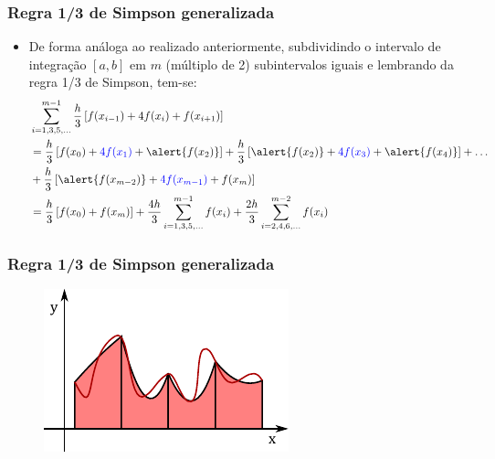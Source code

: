 \documentclass{beamer}
\theoremstyle{mystyle}
\begin{document}
\begin{frame}
	\frametitle{Regra 1/3 de Simpson generalizada}
	\begin{itemize}
		\item De forma análoga ao realizado anteriormente, subdividindo o intervalo de integração $ [a, b] $ em $ m $ (múltiplo de 2) subintervalos iguais e lembrando da regra 1/3 de Simpson, tem-se:
		\begin{align*}
			&\sum_{i=1,3,5,\ldots}^{m-1}\dfrac{h}{3}\left[ f(x_{i-1}) + 4f(x_{i}) + f(x_{i+1}) \right] \\
			&= \dfrac{h}{3}\left[ f(x_{0}) + \textcolor{blue}{4f(x_{1})} + \alert{f(x_{2})}\right] + \dfrac{h}{3}\left[ \alert{f(x_{2})} + \textcolor{blue}{4f(x_{3})} + \alert{f(x_{4})} \right] +\ldots\\
			&+ \dfrac{h}{3}\left[ \alert{f(x_{m-2})} + \textcolor{blue}{4f(x_{m-1})} + f(x_{m}) \right]\\
			&= \dfrac{h}{3}\left[ f(x_{0}) + f(x_{m}) \right] +  \dfrac{4h}{3}\sum_{i=1,3,5,\ldots}^{m-1} f(x_{i}) + \dfrac{2h}{3}\sum_{i=2,4,6,\ldots}^{m-2} f(x_{i}) 
		\end{align*}
	\end{itemize}
\end{frame}

\begin{frame}
	\frametitle{Regra 1/3 de Simpson generalizada}
	\begin{figure}
		\centering
		\includegraphics[width=0.8\linewidth]{Figuras/grafico_08}
		\label{fig:grafico08}
	\end{figure}
\end{frame}
\end{document}
